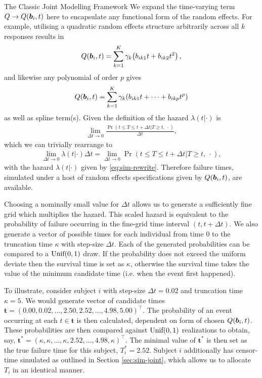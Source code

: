 \begin{chapter}{\label{cha:methods-classic}The Classic Joint Modelling Framework}
  We expand the time-varying term $Q\rightarrow Q(\bm{b}_i, t)$ here to encapsulate any functional form of the random effects. For example, utilising a quadratic random effects structure arbitrarily across all $k$ responses results in 
  \begin{align*}
    Q(\bm{b}_i, t)=\sum_{k=1}^K\gamma_k\!\left( b_{ik1}t+b_{ik2}t^2\right), 
  \end{align*}
  and likewise any polynomial of order $p$ gives
  \begin{align*}
    Q(\bm{b}_i,t)=\sum_{k=1}^K\gamma_k\!\left( b_{ik1}t+\dots+b_{ikp}t^p\right)    
  \end{align*}
  as well as \eg spline term(s). Given the definition of the hazard $\lambda(t|\cdot)$ is 
  \begin{align}
      \underset{\Delta t\rightarrow 0}{\lim}\frac{\Pr(t\le T\le t + \Delta t|T\ge t,\ \cdot)}{\Delta t},
  \label{eq:haz-def}
  \end{align}
  which we can trivially rearrange to
  \begin{align}
    \underset{\Delta t\rightarrow0}{\lim}\lambda(t|\cdot)\Delta t = 
    \underset{\Delta t\rightarrow0}{\lim}\Pr(t\le T\le t + \Delta t|T\ge t,\ \cdot),
    \label{eq:haz-def-dt}
  \end{align}
  with the hazard $\lambda(t|\cdot)$ given by \eqref{eq:sim-rewrite}. Therefore failure times, simulated under a host of random effects specifications given by $Q\!\left(\bm{b}_i,t\right)$, are available. 
  
  Choosing a nominally small value for $\Delta t$ allows us to generate a sufficiently fine grid which multiplies the hazard. This scaled hazard is equivalent to the probability of failure occurring in the fine-grid time interval $(t, t + \Delta t)$. We also generate a vector of possible times for each individual from time $0$ to the truncation time $\kappa$ with step-size $\Delta t$. Each of the generated probabilities can be compared to a $\text{Unif}\!\left(0,1\right)$ draw. If the probability does not exceed the uniform deviate then the survival time is set as $\kappa$, otherwise the survival time takes the value of the minimum candidate time (i.e. when the event first happened).
  
  To illustrate, consider subject $i$ with step-size $\Delta t=0.02$ and truncation time $\kappa=5$. We would generate vector of candidate times $\bm{t}=(0.00, 0.02,\dots,2.50,2.52,\dots,4.98,5.00)^\top$. The probability of an event occurring at each $t\in\bm{t}$ is then calculated, dependent on form of chosen $Q(\bm{b}_i,t)$. These probabilities are then compared against $\text{Unif}\!\left(0,1\right)$ realizations to obtain, say, $\bm{t}^*=(\kappa,\kappa,\dots,\kappa,2.52,\dots,4.98,\kappa)^\top$. The minimal value of $\bm{t}^*$ is then set as the true failure time for this subject, $T_i^*=2.52$. Subject $i$ additionally has censor-time simulated as outlined in Section \ref{sec:sim-joint}, which allows us to allocate $T_i$ in an identical manner.
  

\end{chapter}
